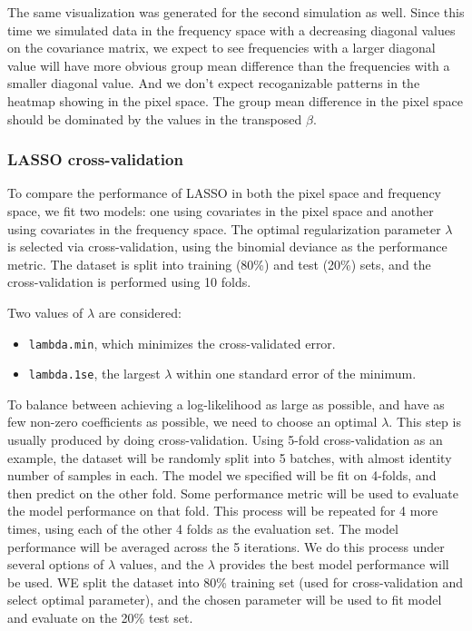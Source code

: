 \documentclass[12pt]{article}
\begin{document}
The same visualization was generated for the second simulation as well. Since this time we simulated data in the frequency space with a decreasing diagonal values on the covariance matrix, we expect to see frequencies with a larger diagonal value will have more obvious group mean difference than the frequencies with a smaller diagonal value. And we don't expect recoganizable patterns in the heatmap showing in the pixel space. The group mean difference in the pixel space should be dominated by the values in the transposed \( \beta \).

\subsubsection{LASSO cross-validation}

To compare the performance of LASSO in both the pixel space and frequency space, we fit two models: one using covariates in the pixel space and another using covariates in the frequency space. The optimal regularization parameter \( \lambda \) is selected via cross-validation, using the binomial deviance as the performance metric. The dataset is split into training (80\%) and test (20\%) sets, and the cross-validation is performed using 10 folds.

Two values of \( \lambda \) are considered: 
\begin{itemize}
  \item \texttt{lambda.min}, which minimizes the cross-validated error.
  \item \texttt{lambda.1se}, the largest \( \lambda \) within one standard error of the minimum.
\end{itemize}

To balance between achieving a log-likelihood as large as possible, and have as few non-zero coefficients as possible, we need to choose an optimal \( \lambda \). This step is usually produced by doing cross-validation. Using 5-fold cross-validation as an example, the dataset will be randomly split into 5 batches, with almost identity number of samples in each. The model we specified will be fit on 4-folds, and then predict on the other fold. Some performance metric will be used to evaluate the model performance on that fold. This process will be repeated for 4 more times, using each of the other 4 folds as the evaluation set. The model performance will be averaged across the 5 iterations. We do this process under several options of \( \lambda \) values, and the \( \lambda \) provides the best model performance will be used. WE split the dataset into 80\% training set (used for cross-validation and select optimal parameter), and the chosen parameter will be used to fit model and evaluate on the 20\% test set.
\end{document}

